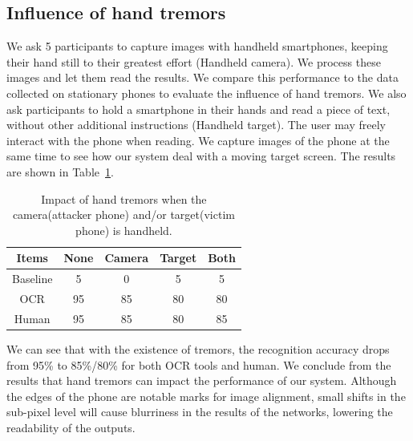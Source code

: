 \subsection{Influence of hand tremors}
We ask 5 participants to capture images with handheld smartphones, keeping their hand still to their greatest effort (Handheld camera). We process these images and let them read the results. We compare this performance to the data collected on stationary phones to evaluate the influence of hand tremors.
We also ask participants to hold a smartphone in their hands and read a piece of text, without other additional instructions (Handheld target). The user may freely interact with the phone when reading. We capture images of the phone at the same time to see how our system deal with a moving target screen. The results are shown in Table~\ref{table-tremor}.

\begin{table}[!t] 
    \centering
    \caption{Impact of hand tremors when the camera(attacker phone) and/or target(victim phone) is handheld.}
    \begin{tabular}{ccccc}
        \toprule
    Items & None & Camera & Target & Both  \\
    \midrule
    Baseline & 5 & 0 & 5& 5\\ 
    \midrule
    OCR & 95 & 85 & 80 & 80\\ 
    Human & 95 & 85 & 80 & 85\\ \bottomrule
    \end{tabular}
    \label{table-tremor}
\end{table}

We can see that with the existence of tremors, the recognition accuracy drops from 95\% to 85\%/80\% for both OCR tools and human. We conclude from the results that hand tremors can impact the performance of our system. Although the edges of the phone are notable marks for image alignment, small shifts in the sub-pixel level will cause blurriness in the results of the networks, lowering the readability of the outputs. 


